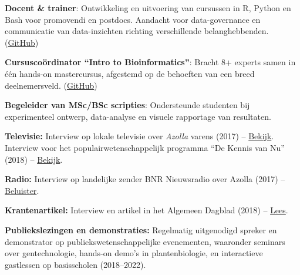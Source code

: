 \documentclass[a4paper,10pt]{article}
\begin{document}
\newpage

\begin{description}
  \raggedright
  \item[\normalfont \textcolor{ForestGreen}{\textbf{2022 -- heden}}] \textbf{Docent \& trainer}: 
    Ontwikkeling en uitvoering van cursussen in R, Python en Bash voor promovendi en postdocs. 
    Aandacht voor data-governance en communicatie van data-inzichten richting verschillende belanghebbenden.  
    (\href{https://github.com/lauralwd/professional_education}{GitHub})
  \item[\normalfont \textcolor{ForestGreen}{\textbf{2020 -- 2021}}] \textbf{Cursuscoördinator “Intro to Bioinformatics”}: 
    Bracht 8+ experts samen in één hands-on mastercursus, afgestemd op de behoeften van een breed deelnemersveld. 
    (\href{https://lauralwd.github.io/metagenomicspractical/}{GitHub})
  \item[\normalfont \textcolor{ForestGreen}{\textbf{2017 -- 2022}}] \textbf{Begeleider van MSc/BSc scripties}: 
    Ondersteunde studenten bij experimenteel ontwerp, data-analyse en visuele rapportage van resultaten.
\end{description}

\vfill

\begin{description}
  \raggedright
  \item \textbf{Televisie:} Interview op lokale televisie over \textit{Azolla} varens (2017) 
    -- \href{https://youtu.be/OI4VV4M2-f4}{Bekijk}. 
    Interview voor het populairwetenschappelijk programma “De Kennis van Nu” (2018) 
    -- \href{https://ntr.nl/Focus/287/detail/Onkruid-als-reddende-engel/VPWON_1292624}{Bekijk}.

  \item \textbf{Radio:} Interview op landelijke zender BNR Nieuwsradio over Azolla (2017) 
    -- \href{https://www.bnr.nl/podcast/wetenschap-vandaag/10346708/utrechts-plantje-geniet-wereldwijde-faam}{Beluister}.

  \item \textbf{Krantenartikel:} Interview en artikel in het Algemeen Dagblad (2018) 
    -- \href{https://www.ad.nl/utrecht/kroosachtig-plantje-uit-sloot-naast-galgenwaard-blijkt-ware-eiwitbom~a1eaba6d/}{Lees}.

  \item \textbf{Publiekslezingen en demonstraties:} Regelmatig uitgenodigd spreker en demonstrator op publiekswetenschappelijke evenementen,
    waaronder seminars over gentechnologie, hands-on demo’s in plantenbiologie, 
    en interactieve gastlessen op basisscholen (2018–2022).
\end{description}
\end{document}
